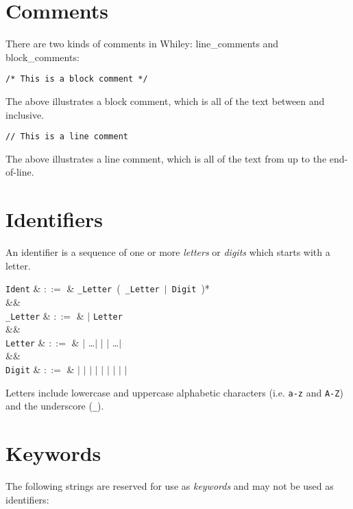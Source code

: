 \section{Comments}
There are two kinds of comments in Whiley: \gls{line_comment}s and \gls{block_comment}s:
\begin{lstlisting}
/* This is a block comment */
\end{lstlisting}
The above illustrates a block comment, which is all of the text between \token{/*} and \token{*/} inclusive.
\begin{lstlisting}
// This is a line comment
\end{lstlisting}
The above illustrates a line comment, which is all of the text from \token{//} up to the end-of-line.

\section{Identifiers}
An identifier is a sequence of one or more {\em letters} or {\em digits} which starts with a letter.
\begin{syntax}
\verb+Ident+ & $::=$ & \verb+_Letter+\ \big(\ \verb+_Letter+\ $|$\ \verb+Digit+\ \big)*\\
&&\\
\verb+_Letter+ & $::=$ & \token{\_} $|$ \verb+Letter+\\
&&\\
\verb+Letter+ & $::=$ &  $|$ \ldots $|$  $|$  $|$ \ldots $|$ \\
&&\\
\verb+Digit+ & $::=$ &  $|$  $|$  $|$  $|$  $|$  $|$  $|$  $|$  $|$ \\
\end{syntax}

Letters include lowercase and uppercase alphabetic characters (i.e. \lstinline+a-z+ and \lstinline+A-Z+) and the underscore (\lstinline+_+).

\section{Keywords}
The following strings are reserved for use as {\em keywords} and may not be used as identifiers:

